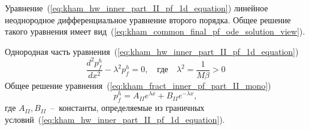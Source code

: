\documentclass{article}
\begin{document}
Уравнение~(\ref{eq:kham_hw_inner_part_II_pf_1d_equation}) линейное неоднородное дифференциальное уравнение второго порядка.
Общее решение такого уравнения имеет вид~(\ref{eq:kham_common_final_pf_ode_solution_view}).

Однородная часть уравнения~(\ref{eq:kham_hw_inner_part_II_pf_1d_equation})
\begin{equation}
	\displaystyle
	\dfrac{d^2 p_f^h}{dx^2}-\lambda^2 p_f^h = 0, \quad \text{где} \quad \lambda^2 = \dfrac{1}{M \beta} > 0
	\label{eq:kham_fract_inner_pf_part_II_mono}
\end{equation}
Общее решение уравнения~(\ref{eq:kham_fract_inner_pf_part_II_mono})
\begin{equation}
	\displaystyle
	p_f^h = A_{II} e^{\lambda x} + B_{II} e^{-\lambda x},
	\label{eq:kham_fract_inner_part_II_pf_mono_solution}
\end{equation}
где $A_{II}, B_{II}$~--~константы, определяемые из граничных условий~(\ref{eq:kham_hw_inner_part_II_pf_1d_equation}).
\end{document}
